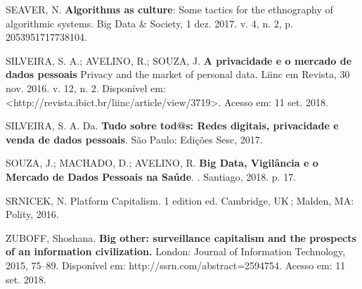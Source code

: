 SEAVER, N. \textbf{Algorithms as culture}: Some tactics for the
ethnography of algorithmic systems. Big Data \& Society, 1 dez. 2017. v.
4, n. 2, p. 2053951717738104.

SILVEIRA, S. A.; AVELINO, R.; SOUZA, J. \textbf{A privacidade e o
mercado de dados pessoais} \textbar{} Privacy and the market of personal
data. Liinc em Revista, 30 nov. 2016. v. 12, n. 2. Disponível em:
\textless{}http://revista.ibict.br/liinc/article/view/3719\textgreater{}.
Acesso em: 11 set. 2018.

SILVEIRA, S. A. Da. \textbf{Tudo sobre tod@s: Redes digitais,
privacidade e venda de dados pessoais}. São Paulo: Edições Sesc, 2017.

SOUZA, J.; MACHADO, D.; AVELINO, R. \textbf{Big Data, Vigilância e o
Mercado de Dados Pessoais na Saúde}. . Santiago, 2018. p. 17.

SRNICEK, N. Platform Capitalism. 1 edition ed. Cambridge, UK\,; Malden,
MA: Polity, 2016.

ZUBOFF, Shoshana. \textbf{Big other: surveillance capitalism and the
prospects of an information civilization.} London: Journal of
Information Technology, 2015, 75--89. Disponível em:
http://ssrn.com/abstract=2594754. Acesso em: 11 set. 2018.

